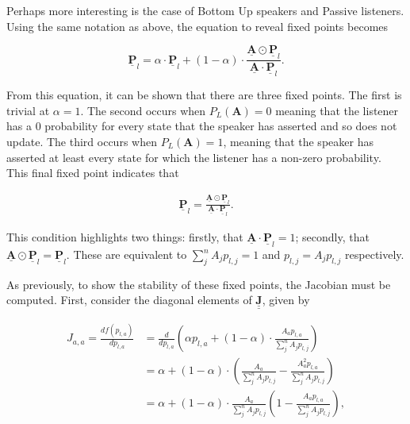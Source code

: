 Perhaps more interesting is the case of Bottom Up speakers and Passive listeners. Using the same notation as above, the equation to reveal fixed points becomes

\begin{equation}
    \underline{\mathbf{P}}_l = \alpha \cdot \underline{\mathbf{P}}_l + (1 - \alpha) \cdot \frac{\underline{\mathbf{A}} \odot \underline{\mathbf{P}}_l}{\underline{\mathbf{A}} \cdot \underline{\mathbf{P}}_l}. \label{eq:BU_FP}
\end{equation}

From this equation, it can be shown that there are three fixed points. The first is trivial at $\alpha = 1$. The second occurs when $P_L(\mathbf{A}) = 0$ meaning that the listener has a $0$ probability for every state that the speaker has asserted and so does not update. The third occurs when $P_L(\mathbf{A}) = 1$, meaning that the speaker has asserted at least every state for which the listener has a non-zero probability. This final fixed point indicates that

\begin{align*}
    \underline{\mathbf{P}}_l = \frac{\underline{\mathbf{A}} \odot \underline{\mathbf{P}}_l}{\underline{\mathbf{A}} \cdot \underline{\mathbf{P}}_l}.
\end{align*}

This condition highlights two things: firstly, that $ \underline{\mathbf{A}} \cdot \underline{\mathbf{P}}_l = 1 $; secondly, that $ \underline{\mathbf{A}} \odot \underline{\mathbf{P}}_l =  \underline{\mathbf{P}}_l$. These are equivalent to $\sum^n_j A_j p_{l,j} = 1$ and $ p_{l,j} = A_j p_{l,j} $ respectively. 

As previously, to show the stability of these fixed points, the Jacobian must be computed. First, consider the diagonal elements of $\underline{\underline{\mathbf{J}}}$, given by

\begin{align}
    J_{a,a} = \frac{d f(p_{l,a})}{d p_{l,a}} &= \frac{d}{d p_{l,a}} \left( \alpha p_{l,a} + (1 - \alpha) \cdot \frac{A_a p_{l,a}}{\sum^n_j A_j p_{l,j}} \right) \\
    &= \alpha + (1 - \alpha) \cdot \left( \frac{A_a}{\sum^n_j A_j p_{l,j}} - \frac{A_a^2 p_{l,a}}{\sum^n_j A_j p_{l,j}} \right) \\
    &= \alpha + (1 - \alpha) \cdot \frac{A_a}{\sum^n_j A_j p_{l,j}} \left( 1 - \frac{A_a p_{l,a}}{\sum^n_j A_j p_{l,j}} \right), \\ 
\end{align}

